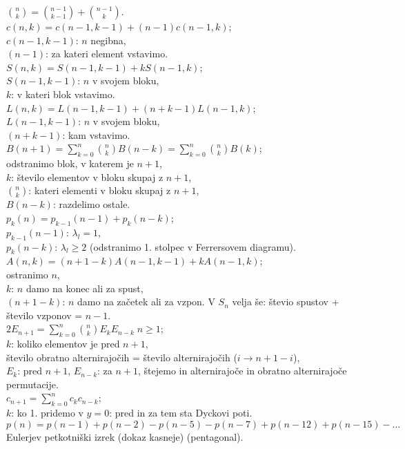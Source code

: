 \documentclass[a4paper, 12pt]{book}
\theoremstyle{definition}
\theoremstyle{remark}
\begin{document}
$\binom{n}{k} = \binom{n-1}{k-1} + \binom{n-1}{k}$. \\
$c(n,k) = c(n-1,k-1) + (n-1) c(n-1,k)$; \\
$c(n-1,k-1)$: $n$ negibna, \\
$(n-1)$: za kateri element vstavimo. \\
$S(n,k) = S(n-1,k-1) + k S(n-1,k)$; \\
$S(n-1,k-1)$: $n$ v svojem bloku, \\
$k$: v kateri blok vstavimo. \\
$L(n,k) = L(n-1,k-1) + (n+k-1) L(n-1,k)$; \\
$L(n-1,k-1)$: $n$ v svojem bloku, \\
$(n+k-1)$: kam vstavimo. \\
$B(n+1) = \sum_{k=0}^{n} \binom{n}{k} B(n-k) = \sum_{k=0}^{n} \binom{n}{k} B(k)$; \\
odstranimo blok, v katerem je $n+1$, \\
$k$: število elementov v bloku skupaj z $n+1$, \\
$\binom{n}{k}$: kateri elementi v bloku skupaj z $n+1$, \\
$B(n-k)$: razdelimo ostale. \\
$p_k(n) = p_{k-1}(n-1) + p_k(n-k)$; \\
$p_{k-1}(n-1)$: $\lambda_l = 1$, \\
$p_k(n-k)$: $\lambda_l \geq 2$ (odstranimo 1. stolpec v Ferrersovem diagramu). \\
$A(n,k) = (n+1-k) A(n-1,k-1) + k A(n-1,k)$; \\
ostranimo $n$, \\
$k$: $n$ damo na konec ali za spust, \\
$(n+1-k)$: $n$ damo na začetek ali za vzpon.
V $S_n$ velja še: števio spustov + število vzponov = $n-1$. \\
$2 E_{n+1} = \sum_{k=0}^{n} \binom{n}{k} E_k E_{n-k} \; n \geq 1$; \\
$k$: koliko elementov je pred $n+1$, \\
število obratno alternirajočih = število alternirajočih ($i \to n+1-i$), \\
$E_k$: pred $n+1$, $E_{n-k}$: za $n+1$, štejemo in alternirajoče in obratno alternirajoče permutacije. \\
$c_{n+1} = \sum_{k=0}^{n} c_k c_{n-k}$; \\
$k$: ko 1. pridemo v $y=0$: pred in za tem sta Dyckovi poti. \\
$p(n) = p(n-1) + p(n-2) - p(n-5) - p(n-7) + p(n-12) + p(n-15) - \dots$ \\
Eulerjev petkotniški izrek (dokaz kasneje) (pentagonal).
\end{document}
